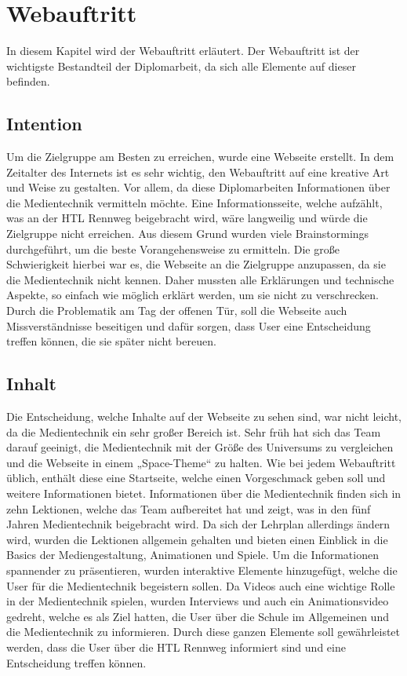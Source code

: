 \chapter{Webauftritt}

\renewcommand{\kapitelautor}{Autor: Hatice Akyokus}

In diesem Kapitel wird der Webauftritt erläutert. Der Webauftritt ist der wichtigste Bestandteil der Diplomarbeit, da sich alle Elemente auf dieser befinden.
 
\section{Intention}
Um die Zielgruppe am Besten zu erreichen, wurde eine Webseite erstellt. In dem Zeitalter des Internets ist es sehr wichtig, den Webauftritt auf eine kreative Art und Weise zu gestalten. Vor allem, da diese Diplomarbeiten Informationen über die Medientechnik vermitteln möchte. Eine Informationsseite, welche aufzählt, was an der HTL Rennweg beigebracht wird, wäre langweilig und würde die Zielgruppe nicht erreichen. Aus diesem Grund wurden viele Brainstormings durchgeführt, um die beste Vorangehensweise zu ermitteln. Die große Schwierigkeit hierbei war es, die Webseite an die Zielgruppe anzupassen, da sie die Medientechnik nicht kennen. Daher mussten alle Erklärungen und technische Aspekte, so einfach wie möglich erklärt werden, um sie nicht zu verschrecken. Durch die Problematik am Tag der offenen Tür, soll die Webseite auch Missverständnisse beseitigen und dafür sorgen, dass User eine Entscheidung treffen können, die sie später nicht bereuen. 

\section{Inhalt}
Die Entscheidung, welche Inhalte auf der Webseite zu sehen sind, war nicht leicht, da die Medientechnik ein sehr großer Bereich ist. Sehr früh hat sich das Team darauf geeinigt, die Medientechnik mit der Größe des Universums zu vergleichen und die Webseite in einem „Space-Theme“ zu halten. Wie bei jedem Webauftritt üblich, enthält diese eine Startseite, welche einen Vorgeschmack geben soll und weitere Informationen bietet. Informationen über die Medientechnik finden sich in zehn Lektionen, welche das Team aufbereitet hat und zeigt, was in den fünf Jahren Medientechnik beigebracht wird. Da sich der Lehrplan allerdings ändern wird, wurden die Lektionen allgemein gehalten und bieten einen Einblick in die Basics der Mediengestaltung, Animationen und Spiele. Um die Informationen spannender zu präsentieren, wurden interaktive Elemente hinzugefügt, welche die User für die Medientechnik begeistern sollen. Da Videos auch eine wichtige Rolle in der Medientechnik spielen, wurden Interviews und auch ein Animationsvideo gedreht, welche es als Ziel hatten, die User über die Schule im Allgemeinen und die Medientechnik zu informieren. Durch diese ganzen Elemente soll gewährleistet werden, dass die User über die HTL Rennweg informiert sind und eine Entscheidung treffen können. 

